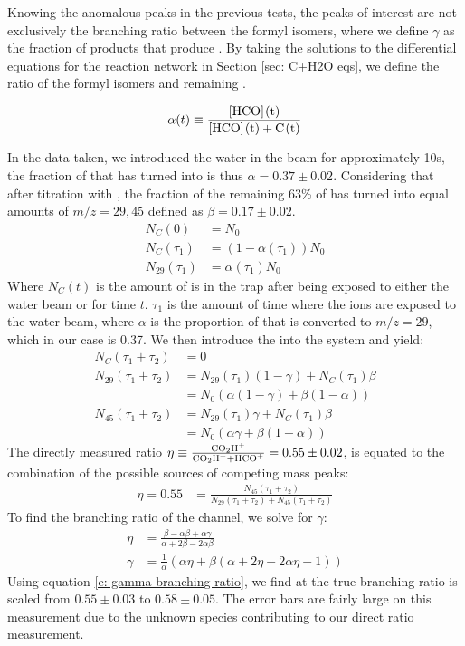 Knowing the anomalous peaks in the previous tests, the peaks of interest are not exclusively the branching ratio between the formyl isomers, where we define $\gamma$ as the fraction of products that produce . By taking the solutions to the differential equations for the  reaction network in Section \ref{sec: C+H2O eqs}, we define the ratio of the formyl isomers and remaining .

\begin{equation}
	\alpha(t) \equiv \frac{\ce{[HCO](t)}}{\ce{[HCO](t) + C(t)}}
\end{equation}

In the data taken, we introduced the water in the beam for approximately 10s, the fraction of  that has turned into \ce{[HCO]+} is thus $\alpha = 0.37 \pm 0.02$. Considering that after titration with , the fraction of the remaining 63\% of  has turned into equal amounts of $m/z=29, 45$ defined as $\beta = 0.17 \pm 0.02$.
\begin{align*}
	N_C(0) & = N_0 \\
	N_C(\tau_1) & = (1-\alpha(\tau_1))N_0 \\
	N_{29}(\tau_1) & = \alpha(\tau_1) N_0
\end{align*}
Where $N_C(t)$ is the amount of  is in the trap after being exposed to either the water beam or  for time $t$. $\tau_1$ is the amount of time where the ions are exposed to the water beam, where $\alpha$ is the proportion of  that is converted to $m/z=29$, which in our case is 0.37. We then introduce the  into the system and yield:
\begin{align*}
	N_C(\tau_1 + \tau_2) & = 0 \\
	N_{29}(\tau_1 + \tau_2) & = N_{29}(\tau_1)(1-\gamma) + N_C(\tau_1)\beta \\
	& = N_0(\alpha(1-\gamma)+\beta(1-\alpha)) \\
	N_{45}(\tau_1 + \tau_2) & = N_{29}(\tau_1)\gamma + N_C(\tau_1)\beta \\
	& = N_0(\alpha \gamma+\beta(1-\alpha))
\end{align*}
The directly measured ratio $\eta \equiv \frac{\ce{CO2H+}}{\ce{CO2H+} + \ce{HCO+}} = 0.55 \pm 0.02$, is equated to the combination of the possible sources of competing mass peaks:
\begin{align}
	\eta = 0.55 & = \frac{N_{45}(\tau_1 + \tau_2)}{N_{29}(\tau_1 + \tau_2) + N_{45}(\tau_1 + \tau_2)}
\end{align}
To find the branching ratio of the  channel, we solve for $\gamma$:
\begin{align}
	\eta & = \frac{\beta - \alpha \beta + \alpha \gamma}{\alpha + 2\beta - 2\alpha\beta} \nonumber \\
	\gamma & = \frac{1}{\alpha} (\alpha \eta + \beta(\alpha + 2\eta - 2\alpha \eta - 1)) \label{e: gamma branching ratio}
\end{align}
Using equation \ref{e: gamma branching ratio}, we find at the true branching ratio is scaled from $0.55 \pm 0.03$ to $0.58 \pm 0.05$. The error bars are fairly large on this measurement due to the unknown species contributing to our direct ratio measurement.

